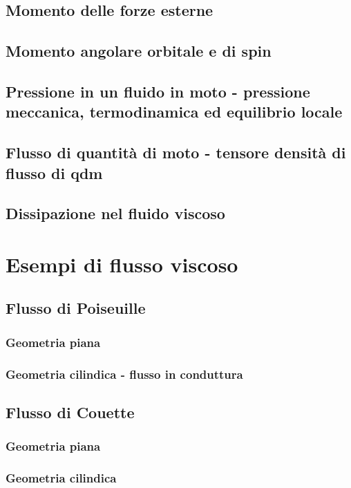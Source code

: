 \documentclass[a4paper,11pt]{report}
\begin{document}
	\section{Momento delle forze esterne}
	\section{Momento angolare orbitale e di spin}
	
	\section{Pressione in un fluido in moto - pressione meccanica, termodinamica ed equilibrio locale}
	\section{Flusso di quantità di moto - tensore densità di flusso di qdm}
	\section{Dissipazione nel fluido viscoso}
	
\chapter{Esempi di flusso viscoso}

	\section{Flusso di Poiseuille}
		\subsection{Geometria piana}
		\subsection{Geometria cilindica - flusso in conduttura}
	\section{Flusso di Couette}
		\subsection{Geometria piana}
		\subsection{Geometria cilindica}
	
\end{document}
